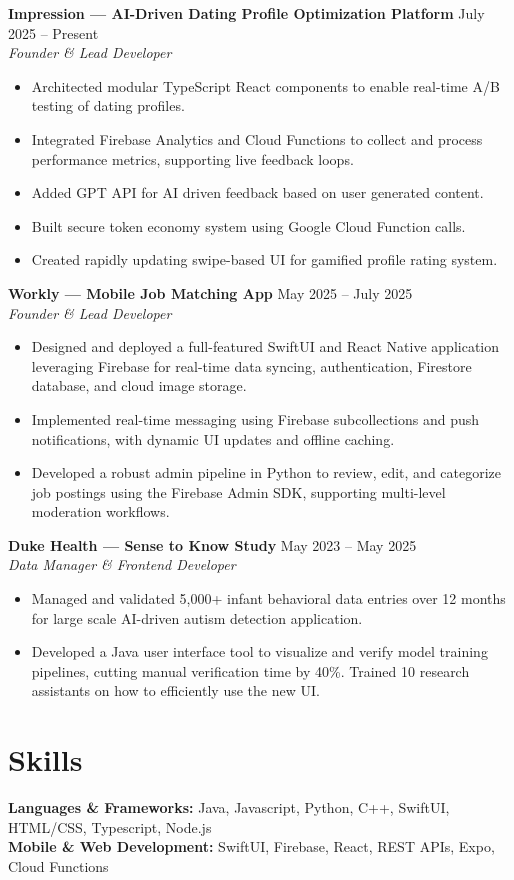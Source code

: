 \documentclass[11pt]{article}
\begin{document}
\textbf{Impression — AI-Driven Dating Profile Optimization Platform} \hfill July 2025 -- Present\\
\textit{Founder \& Lead Developer}
\begin{itemize}
    \item Architected modular TypeScript React components to enable real-time A/B testing of dating profiles.
    \item Integrated Firebase Analytics and Cloud Functions to collect and process performance metrics, supporting live feedback loops.
    \item Added GPT API for AI driven feedback based on user generated content.
    \item Built secure token economy system using Google Cloud Function calls.
    \item Created rapidly updating swipe-based UI for gamified profile rating system.
\end{itemize}

\textbf{Workly — Mobile Job Matching App} \hfill May 2025 -- July 2025\\
\textit{Founder \& Lead Developer}
\begin{itemize}
    \item Designed and deployed a full-featured SwiftUI and React Native application leveraging Firebase for real-time data syncing, authentication, Firestore database, and cloud image storage.
    \item Implemented real-time messaging using Firebase subcollections and push notifications, with dynamic UI updates and offline caching.
    \item Developed a robust admin pipeline in Python to review, edit, and categorize job postings using the Firebase Admin SDK, supporting multi-level moderation workflows.
\end{itemize}

\textbf{Duke Health — Sense to Know Study} \hfill May 2023 -- May 2025\\
\textit{Data Manager \& Frontend Developer}
\begin{itemize}
    \item Managed and validated 5,000+ infant behavioral data entries over 12 months for large scale AI-driven autism detection application.
    \item Developed a Java user interface tool to visualize and verify model training pipelines, cutting manual verification time by 40\%. Trained 10 research assistants on how to efficiently use the new UI.
\end{itemize}

\section*{Skills}
\textbf{Languages \& Frameworks:} Java, Javascript, Python, C++, SwiftUI, HTML/CSS, Typescript, Node.js\\
\textbf{Mobile \& Web Development:} SwiftUI, Firebase, React, REST APIs, Expo, Cloud Functions\\
\end{document}
